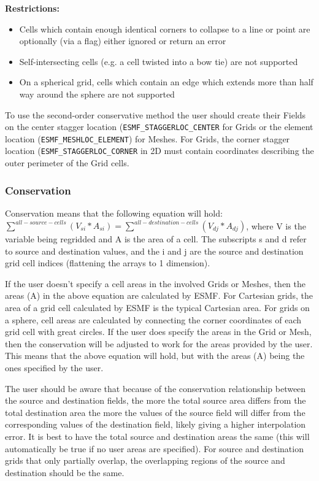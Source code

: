 \smallskip

{\bf Restrictions:}
 \begin{itemize}
 \item Cells which contain enough identical corners to collapse to a line or point are optionally (via a flag) either ignored or return an error
 \item Self-intersecting cells (e.g. a cell twisted into a bow tie) are not supported
 \item On a spherical grid, cells which contain an edge which extends more than half way around the sphere are not supported 
 \end{itemize}
 
\smallskip

 To use the second-order conservative method the user should create their Fields on the center 
 stagger location ({\tt ESMF\_STAGGERLOC\_CENTER} for Grids  or the element location ({\tt ESMF\_MESHLOC\_ELEMENT}) for Meshes.
 For Grids, the corner stagger location ({\tt ESMF\_STAGGERLOC\_CORNER} in 2D must contain coordinates describing the outer perimeter of the Grid cells. 

\subsubsection{Conservation}\label{sec:interpolation:conservation}
 Conservation means that the following equation will hold:  $\sum^{all-source-cells}(V_{si}*A_{si}) = \sum^{all-destination-cells}(V_{dj}*A_{dj})$, where
 V is the variable being regridded and A is the area of a cell.  The subscripts s and d refer to source and destination values, and the i and j are the source  and destination grid cell indices (flattening the arrays to 1 dimension). 

 If the user doesn't specify a cell areas in the involved Grids or Meshes, then the areas (A) in the above equation are calculated by ESMF. 
 For Cartesian grids, the area of a grid cell calculated by ESMF is the typical Cartesian area. 
 For grids on a sphere, cell areas are calculated by connecting the corner coordinates of each grid cell with great circles. If the user 
 does specify the areas in the Grid or Mesh, then the conservation will be adjusted to work for the areas 
 provided by the user. This means that the above equation will hold, but with the areas (A) being the ones specified by the user.

 The user should be aware that because of the conservation relationship between the source and destination fields, the more the total source area
 differs from the total destination area the more the values of the source field will differ from the corresponding values of the destination field, 
 likely giving a higher interpolation error. It is best to have the total source and destination areas the same 
 (this will automatically be true if no user areas are specified). For source and destination grids 
 that only partially overlap, the overlapping regions of the source and destination should be the same.

